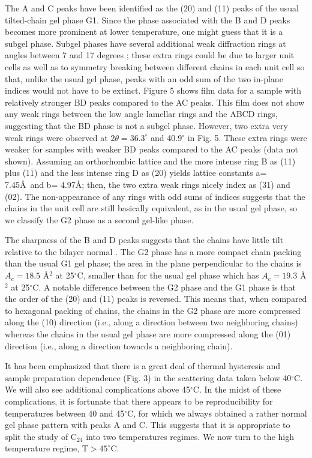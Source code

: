 The A and C peaks have been identified as the (20) and (11)
peaks of the usual tilted-chain gel phase G1.  Since the phase associated with
the B and D peaks becomes more prominent at lower temperature, one might
guess that it is a subgel phase.  Subgel phases have several
additional weak diffraction rings at angles between 7 and 17 degrees
\cite{RuoS82A,RuoS82B,Stum83,STN94}; 
these extra rings could be due to larger unit cells as well as 
to symmetry breaking between different chains in each unit cell 
so that, unlike the usual gel phase, peaks with an odd sum of the two 
in-plane indices would not have to be extinct. Figure 5 shows film data 
for a sample with relatively stronger BD peaks compared to the AC peaks.
This film does not show any weak rings between the low angle lamellar rings
and the ABCD rings, suggesting that the BD phase is not a subgel phase.
However, two extra very weak rings were observed at $2\theta = 36.3^{\circ}$ 
and 40.9$^{\circ}$ in Fig. 5.  These extra rings were weaker for samples with
weaker BD peaks compared to the AC peaks (data not shown).
Assuming an orthorhombic lattice and the more intense ring B as (11) plus 
(1$\bar{1}$) and the less intense ring D as (20) yields lattice constants 
a= 7.45\AA\ and b= 4.97\AA ; then, the two extra weak rings nicely index 
as (31) and (02).  The non-appearance of 
any rings with odd sums of indices suggests that the chains in the unit cell 
are still basically equivalent, as in the usual gel phase,
so we classify the G2 phase as a second gel-like phase.

The sharpness of the B and D peaks suggests that the chains have little 
tilt relative to the bilayer normal \cite{Smi88,McI80}. The G2 phase has a
more compact chain packing than the usual G1 gel phase;
the area in the plane perpendicular to the
chains is $A_c = 18.5$ \AA$^2$ at 25$^{\circ}$C, smaller
than for the usual gel phase which has $A_c = 19.3$ \AA$^2$ at 25$^{\circ}$C.
A notable difference between the G2 phase and the G1 phase is that the
order of the (20) and (11) peaks is reversed.  This means that, when
compared to hexagonal packing of chains, the chains in the
G2 phase are more compressed along the (10) direction (i.e., along a 
direction between two neighboring chains) whereas the chains in the usual gel 
phase are more compressed along the (01) direction (i.e., along a 
direction towards a neighboring chain).

It has been emphasized that there is a great deal of thermal hysteresis
and sample preparation dependence (Fig. 3) in the scattering data
taken below 40$^{\circ}$C. We will also see additional complications above 
45$^{\circ}$C. In the midst of these complications, it is fortunate 
that there appears to be reproducibility for temperatures between 40 and 
45$^{\circ}$C, for which we always obtained a rather normal gel phase pattern 
with peaks A and C. This suggests that it is appropriate to split the study of 
C$_{24}$ into two temperatures regimes. We now turn to the high temperature 
regime, T$ > 45^{\circ}$C.  

